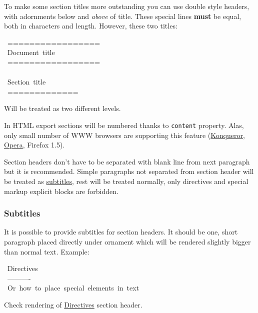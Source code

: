 \documentclass[12pt]{article}
\begin{document}
To make some section titles more outstanding you can use double style headers,
with adornments below and \emph{above} of title. These special lines \textbf{must} be
equal, both in characters and length. However, these two titles:

\begin{ttfamily}\begin{flushleft}
\mbox{~=================}\\
\mbox{~Document~title}\\
\mbox{~=================}\\
\mbox{}\\
\mbox{~Section~title}\\
\mbox{~=============}\\
\end{flushleft}\end{ttfamily}

Will be treated as two different levels.

In HTML export sections will be numbered thanks to \texttt{content} property.
Alas, only small number of WWW browsers are supporting this feature
(\href{http://www.kde.org}{Konqueror}, \href{http://www.opera.com}{Opera}, Firefox 1.5).

Section headers don't have to be separated with blank line from next paragraph
but it is recommended. Simple paragraphs not separated from section header
will be treated as \href{\#lsubtitles}{subtitles}, rest will be treated normally, only directives
and special markup explicit blocks are forbidden.

\hypertarget{lsubtitles}{}
\subsubsection{Subtitles}

It is possible to provide subtitles for section headers. It should be one,
short paragraph placed directly under ornament which will be rendered slightly
bigger than normal text. Example:

\begin{ttfamily}\begin{flushleft}
\mbox{~Directives}\\
\mbox{~----------}\\
\mbox{~Or~how~to~place~special~elements~in~text}\\
\end{flushleft}\end{ttfamily}

Check rendering of \href{\#ldirectives}{Directives} section header.
\end{document}
